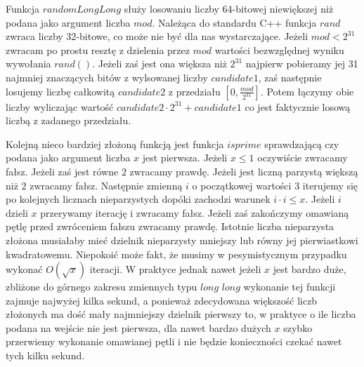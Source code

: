 \documentclass{article}
\begin{document}
Funkcja $randomLongLong$ służy losowaniu liczby 64-bitowej niewiększej niż podana jako argument 
liczba $mod$. Należąca do standardu C++ funkcja $rand$ zwraca liczby 32-bitowe, co może nie być dla nas
wystarczające. Jeżeli $mod<2^{31}$ zwracam po prostu resztę z dzielenia przez $mod$ wartości bezwzględnej
wyniku wywołania $rand()$. Jeżeli zaś jest ona większa niż $2^{31}$ najpierw pobieramy jej 31 
najmniej znaczących bitów z wylsowanej liczby $candidate1$, zaś następnie losujemy liczbę 
całkowitą $candidate2$ z przedziału $[0,\frac{mod}{2^{31}}]$.
Potem łączymy obie liczby wyliczając wartość $candidate2 \cdot 2^{31}+candidate1$ co jest faktycznie 
losową liczbą z zadanego przedziału.

Kolejną nieco bardziej złożoną funkcją jest funkcja $isprime$ sprawdzającą czy podana jako argument 
liczba $x$ jest pierwsza. Jeżeli $x \leq 1$ oczywiście zwracamy fałsz. Jeżeli zaś jest równe $2$ zwracamy
prawdę. Jeżeli jest liczną parzystą większą niż $2$ zwracamy fałsz. Następnie zmienną $i$ o początkowej wartości $3$ 
iterujemy się po kolejnych licznach nieparzystych dopóki zachodzi warunek $i \cdot i \leq x$.
Jeżeli $i$ dzieli $x$ przerywamy iterację i zwracamy fałsz. Jeżeli zaś zakończymy omawianą pętlę przed zwróceniem fałszu
zwracamy prawdę. Istotnie liczba nieparzysta złożona musiałaby mieć dzielnik nieparzysty mniejszy lub równy jej
pierwiastkowi kwadratowemu. Niepokoić może fakt, że musimy w pesymistycznym przypadku wykonać $O(\sqrt{x})$ iteracji.
W praktyce jednak nawet jeżeli $x$ jest bardzo duże, zbliżone do górnego zakresu zmiennych typu $long$ $long$ 
wykonanie tej funkcji zajmuje najwyżej kilka sekund, a ponieważ zdecydowana większość liczb złożonych ma 
dość mały najmniejszy dzielnik pierwszy to, w praktyce o ile liczba podana na wejście nie jest pierwsza, dla nawet bardzo dużych $x$ szybko przerwiemy wykonanie omawianej pętli i nie będzie konieczności czekać nawet tych kilku sekund.
\end{document}
